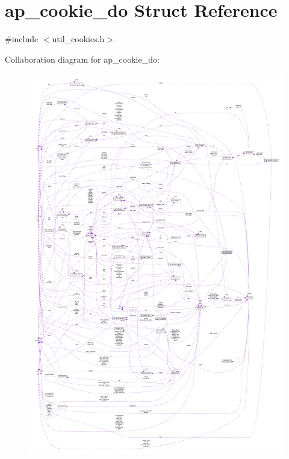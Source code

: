 \hypertarget{structap__cookie__do}{}\section{ap\+\_\+cookie\+\_\+do Struct Reference}
\label{structap__cookie__do}


{\ttfamily \#include $<$util\+\_\+cookies.\+h$>$}



Collaboration diagram for ap\+\_\+cookie\+\_\+do\+:
\nopagebreak
\begin{figure}[H]
\begin{center}
\leavevmode
\includegraphics[width=350pt]{structap__cookie__do__coll__graph}
\end{center}
\end{figure}
